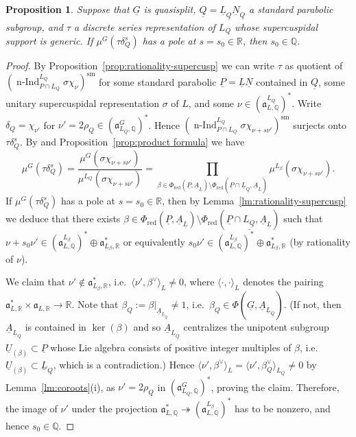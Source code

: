 \documentclass[a4paper]{amsart}
\numberwithin{equation}{section}
\newtheorem{prop}[thm]{Proposition}
\theoremstyle{remark}
\theoremstyle{definition}
\DeclareMathOperator{\nInd}{n-Ind}
\newcommand{\Q}{\mathbb{Q}}
\newcommand{\R}{\mathbb{R}}
\newcommand{\sm}{\mathrm{sm}}
\newcommand{\alggrp}[1]{\underline{#1}}
\begin{document}
\begin{prop}\label{prop:rationality-discrete-series}
  Suppose that $\alggrp{G}$ is quasisplit, $\alggrp{Q} = \alggrp{L}_{\alggrp Q}\alggrp{N}_{\alggrp Q}$ a standard parabolic subgroup, and $\tau$ a discrete series representation of $L_Q$ whose supercuspidal support is generic.
  If $\mu^G(\tau \delta_Q^s)$ has a pole at $s = s_0 \in \R$, then $s_0 \in \Q$.
\end{prop}

\begin{proof}
  By Proposition~\ref{prop:rationality-supercusp} we can write $\tau$ as quotient of $(\nInd_{P \cap L_Q}^{L_Q} \sigma \chi_\nu)^\sm$ for some standard parabolic $\alggrp{P} = \alggrp{L}\alggrp{N}$
  contained in $\alggrp{Q}$, some unitary supercuspidal representation $\sigma$ of $L$, and some $\nu \in (\mathfrak{a}_{L,\Q}^{L_Q})^*$.
  Write $\delta_Q = \chi_{\nu'}$ for $\nu' = 2\rho_Q \in (\mathfrak{a}^G_{L_Q,\Q})^*$.   Hence $(\nInd_{P \cap L_Q}^{L_Q} \sigma \chi_{\nu+s\nu'})^\sm$ surjects onto $\tau\delta_Q^s$.
  By \cite[Theorem~1]{MR570781} and Proposition~\ref{prop:product formula} we have
  \begin{equation*}
    \mu^G(\tau \delta_Q^s) = \frac{\mu^G(\sigma \chi_{\nu+s\nu'})}{\mu^{L_Q}(\sigma \chi_{\nu+s\nu'})}
    = \prod_{\beta \in \Phi_{\mathrm{red}}(\alggrp P,\alggrp A_{\alggrp L})\setminus\Phi_{\mathrm{red}}(\alggrp P \cap \alggrp L_{\alggrp Q},\alggrp A_{\alggrp L})} \mu^{L_\beta}(\sigma \chi_{\nu+s\nu'}).
  \end{equation*}
  If $\mu^G(\tau \delta_Q^s)$ has a pole at $s = s_0 \in \R$, then by Lemma~\ref{lm:rationality-supercusp} we deduce that
  there exists $\beta \in \Phi_{\mathrm{red}}(\alggrp{P},\alggrp{A}_{\alggrp{L}})\setminus\Phi_{\mathrm{red}}(\alggrp{P} \cap \alggrp{L_{\alggrp Q}},\alggrp{A}_{\alggrp{L}})$ such that
  $\nu+s_0\nu' \in (\mathfrak{a}^{L_\beta}_{L,\Q})^* \oplus \mathfrak{a}_{L_\beta,\R}^*$ or equivalently $s_0\nu' \in (\mathfrak{a}^{L_\beta}_{L,\Q})^* \oplus \mathfrak{a}_{L_\beta,\R}^*$
  (by rationality of $\nu$). 

  We claim that $\nu' \notin \mathfrak{a}_{L_\beta,\R}^*$, i.e.\ $\langle\nu',\beta^\vee\rangle_L \ne 0$, where $\langle\cdot,\cdot\rangle_{L}$ denotes the pairing $\mathfrak{a}_{L,\R}^*\times \mathfrak{a}_{L,\R}\to \R$.
  Note that $\beta_Q := \beta|_{\alggrp A_{\alggrp L_{\alggrp Q}}} \ne 1$, i.e.\ $\beta_Q \in \Phi(\alggrp G,\alggrp A_{\alggrp L_{\alggrp Q}})$.
  (If not, then $\alggrp A_{\alggrp L_{\alggrp Q}}$ is contained in $\ker(\beta)$ and so $\alggrp A_{\alggrp L_{\alggrp Q}}$ centralizes the unipotent subgroup
  $\alggrp U_{(\beta)} \subset \alggrp P$ whose Lie algebra consists of positive integer multiples of $\beta$, i.e.\
  $\alggrp U_{(\beta)} \subset \alggrp L_{\alggrp Q}$, which is a contradiction.)
  Hence $\langle \nu',\beta^\vee\rangle_L = \langle \nu', \beta_Q^\vee\rangle_{L_Q} \ne 0$ by Lemma~\ref{lm:coroots}(i), as $\nu' = 2\rho_Q$ in $(\mathfrak{a}^G_{L_Q,\Q})^*$,
  proving the claim.
  Therefore, the image of $\nu'$ under the projection $\mathfrak{a}_{L,\Q}^* \twoheadrightarrow (\mathfrak{a}^{L_\beta}_{L,\Q})^*$ has to be nonzero, and hence $s_0 \in \Q$.
\end{proof}
\end{document}
